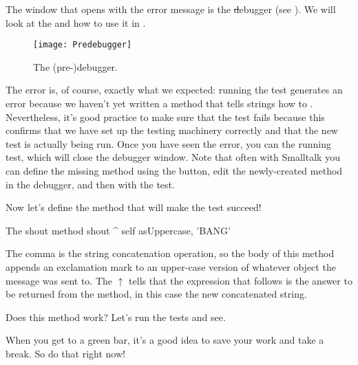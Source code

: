 \documentclass[a4paper,10pt,twoside]{book}
\begin{document}
The window that opens with the error message is the \st debugger (see ).
We will look at the  and how to use it in .

\begin{figure}[hbt]
\centerline {\texttt{[image: Predebugger]}}
\caption{The (pre-)debugger.}
\end{figure}

The error is, of course, exactly what we expected:  running the test generates an error because we haven't yet written a method that tells strings how to .  
Nevertheless, it's good practice to make sure that the test fails because this confirms that we have set up the testing machinery correctly and that the new test is actually being run.
Once you have seen the error, you can  the running test, which will close the debugger window.
Note that often with Smalltalk you can define the missing method using the  button, edit the newly-created method in the debugger, and then  with the test.

Now let's define the method that will make the test succeed!

\begin{method}[shout]{The shout method}
shout
	^ self asUppercase, 'BANG'
\end{method}

The comma is the string concatenation operation, so the body of this method appends an exclamation mark to an upper-case version of whatever  object the  message was sent to.
The $\uparrow$ tells \pharo that the expression that follows is the answer to be returned from the method, in this case the new concatenated string.

Does this method work?  Let's run the tests and see.

When you get to a green bar\footnotemark, it's a good idea to save your work and take a break.  
So do that right now!
\end{document}
